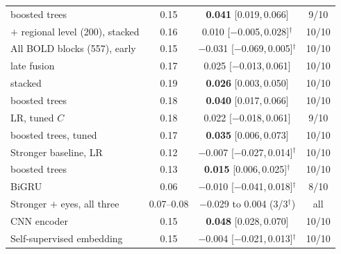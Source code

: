 \begin{table}[t]
\begin{tabular}{@{}lccc@{}}
\quad boosted trees & 0.15 & \textbf{0.041} [0.019,\,0.066] & 9/10 \\
$+$ regional level (200), stacked & 0.16 & 0.010 [$-$0.005,\,0.028]$^\dagger$ & 10/10 \\
All BOLD blocks (557), early & 0.15 & $-$0.031 [$-$0.069,\,0.005]$^\dagger$ & 10/10 \\
\quad late fusion & 0.17 & 0.025 [$-$0.013,\,0.061] & 10/10 \\
\quad stacked & 0.19 & \textbf{0.026} [0.003,\,0.050] & 10/10 \\
\quad boosted trees & 0.18 & \textbf{0.040} [0.017,\,0.066] & 10/10 \\
\quad LR, tuned $C$ & 0.18 & 0.022 [$-$0.018,\,0.061] & 9/10 \\
\quad boosted trees, tuned & 0.17 & \textbf{0.035} [0.006,\,0.073] & 10/10 \\
\midrule
Stronger baseline, LR & 0.12 & $-$0.007 [$-$0.027,\,0.014]$^\dagger$ & 10/10 \\
\quad boosted trees & 0.13 & \textbf{0.015} [0.006,\,0.025]$^\dagger$ & 10/10 \\
\quad BiGRU & 0.06 & $-$0.010 [$-$0.041,\,0.018]$^\dagger$ & 8/10 \\
Stronger $+$ eyes, all three & 0.07--0.08 & $-$0.029 to 0.004 (3/3$^\dagger$) & all \\
\midrule
CNN encoder & 0.15 & \textbf{0.048} [0.028,\,0.070] & 10/10 \\
Self-supervised embedding & 0.15 & $-$0.004 [$-$0.021,\,0.013]$^\dagger$ & 10/10 \\
\bottomrule
\end{tabular}
\end{table}
